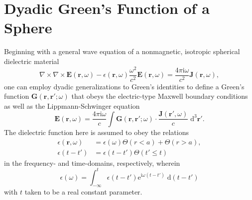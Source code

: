 \documentclass{article}
\begin{document}
\section{Dyadic Green's Function of a Sphere}

Beginning with a general wave equation of a nonmagnetic, isotropic spherical dielectric material
\begin{equation}
\nabla\times\nabla\times\mathbf{E}(\mathbf{r},\omega) - \epsilon(\mathbf{r},\omega)\frac{\omega^2}{c^2}\mathbf{E}(\mathbf{r},\omega) = \frac{4\pi\mathrm{i}\omega}{c^2}\mathbf{J}(\mathbf{r},\omega),
\end{equation}
one can employ dyadic generalizations to Green's identities to define a Green's function $\mathbf{G}(\mathbf{r},\mathbf{r}';\omega)$ that obeys the electric-type Maxwell boundary conditions as well as the Lippmann-Schwinger equation
\begin{equation}
\mathbf{E}(\mathbf{r},\omega) = \frac{4\pi\mathrm{i}\omega}{c}\int\mathbf{G}(\mathbf{r},\mathbf{r}';\omega)\cdot\frac{\mathbf{J}(\mathbf{r}',\omega)}{c}\;\mathrm{d}^3\mathbf{r}'.
\end{equation}
The dielectric function here is assumed to obey the relations
\begin{equation}
\begin{split}
\epsilon(\mathbf{r},\omega) &= \epsilon(\omega)\Theta(r < a) + \Theta(r > a),\\
\epsilon(t - t') &= \epsilon(t - t')\Theta(t' \leq t)
\end{split}
\end{equation}
in the frequency- and time-domains, respectively, wherein
\begin{equation}
\epsilon(\omega) = \int_{-\infty}^t \epsilon(t - t')\mathrm{e}^{\mathrm{i}\omega(t - t')}\;\mathrm{d}(t-t')
\end{equation}
with $t$ taken to be a real constant parameter. 
\end{document}

